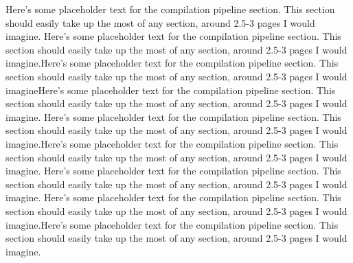 \documentclass[preprint]{sigplanconf}
\begin{document}
Here's some placeholder text for the compilation pipeline section.  This
section should easily take up the most of any section, around 2.5-3 pages I
would imagine.
Here's some placeholder text for the compilation pipeline section.  This
section should easily take up the most of any section, around 2.5-3 pages I
would imagine.Here's some placeholder text for the compilation pipeline section.
 This
section should easily take up the most of any section, around 2.5-3 pages I
would imagineHere's some placeholder text for the compilation pipeline section.
This
section should easily take up the most of any section, around 2.5-3 pages I
would imagine.
Here's some placeholder text for the compilation pipeline section.  This
section should easily take up the most of any section, around 2.5-3 pages I
would imagine.Here's some placeholder text for the compilation pipeline section.
 This
section should easily take up the most of any section, around 2.5-3 pages I
would imagine.
Here's some placeholder text for the compilation pipeline section.  This
section should easily take up the most of any section, around 2.5-3 pages I
would imagine.
Here's some placeholder text for the compilation pipeline section.  This
section should easily take up the most of any section, around 2.5-3 pages I
would imagine.Here's some placeholder text for the compilation pipeline section.
 This
section should easily take up the most of any section, around 2.5-3 pages I
would imagine.
\end{document}
